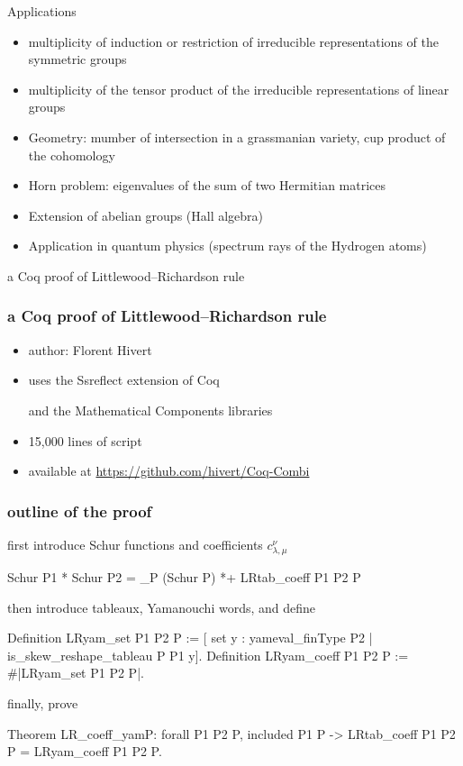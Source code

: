 \documentclass{beamer}
\let\emph\alert
\begin{document}

\begin{frame}{Applications}
  \begin{itemize}
  \item multiplicity of induction or restriction of irreducible representations
    of the symmetric groups
  \item multiplicity of the tensor product of the irreducible representations
    of linear groups
  \item Geometry: mumber of intersection in a grassmanian variety, cup product
    of the cohomology
  \item Horn problem: eigenvalues of the sum of two Hermitian matrices
  \item Extension of abelian groups (Hall algebra)
  \item Application in quantum physics (spectrum rays of the Hydrogen atoms)
  \end{itemize}
\end{frame}

\begin{frame}
  \begin{center}
    \emph{a Coq proof of Littlewood–Richardson rule} \\
    \hrulefill
  \end{center}
\end{frame}

\begin{frame}\frametitle{a Coq proof of Littlewood–Richardson rule}
  \begin{itemize}
  \item author: Florent Hivert
  \item uses the Ssreflect extension of Coq \par
    and the Mathematical Components libraries
  \item 15,000 lines of script
  \item available at \url{https://github.com/hivert/Coq-Combi}
  \end{itemize}
\end{frame}

\begin{frame}[fragile]\frametitle{outline of the proof}
  first introduce Schur functions and coefficients $c_{\lambda, \mu}^{\nu}$
\begin{coq}
Schur P1 * Schur P2 =
  \sum_P (Schur P) *+ LRtab_coeff P1 P2 P
\end{coq}
  then introduce tableaux, Yamanouchi words, and define
\begin{coq}
Definition LRyam_set P1 P2 P :=
  [ set y : yameval_finType P2 |
    is_skew_reshape_tableau P P1 y].
Definition LRyam_coeff P1 P2 P :=
  #|LRyam_set P1 P2 P|.
\end{coq}
  finally, prove
\begin{coq}
Theorem LR_coeff_yamP:
  forall P1 P2 P, included P1 P ->
  LRtab_coeff P1 P2 P = LRyam_coeff P1 P2 P.
\end{coq}
\end{frame}
\end{document}
